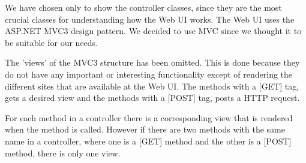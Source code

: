 We have chosen only to show the controller classes, since they are the most crucial classes for understanding how the Web UI works. The Web UI uses
the ASP.NET MVC3 design pattern. We decided to use MVC since we thought it to be suitable for our needs. 

The 'views' of the MVC3 structure has been omitted. This is done because they do not have any important or interesting functionality except of rendering
the different sites that are available at the Web UI. The methods with a [GET] tag, gets a desired view and the methods with a [POST] tag, posts a HTTP request.

For each method in a controller there is a corresponding view that is rendered when the method is called. However if there are two methods with the same 
name in a controller, where one is a [GET] method and the other is a [POST] method, there is only one view.
